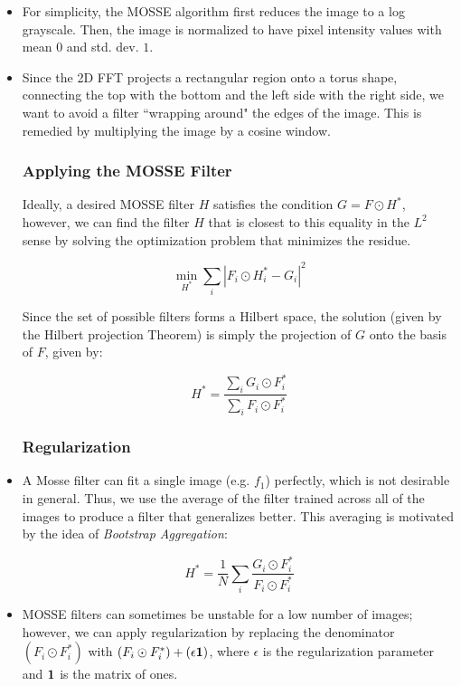 \documentclass[12pt]{article}
\newcommand{\bv}[1]{\ensuremath\mathbf{#1}}
\begin{document}
\begin{itemize}
\item For simplicity, the MOSSE algorithm first reduces the image to a log grayscale. Then, the image is normalized to have pixel intensity values with mean $0$ and std. dev. $1$.

\item Since the 2D FFT projects a rectangular region onto a torus shape, connecting the top with the bottom and the left side with the right side, we want to avoid a filter ``wrapping around" the edges of the image. This is remedied by multiplying the image by a cosine window.

\subsubsection*{Applying the MOSSE Filter}

Ideally, a desired MOSSE filter $H$ satisfies the condition $G = F \odot H^*$, however, we can find the filter $H$ that is closest to this equality in the $L^2$ sense by solving the optimization problem that minimizes the residue.

$$\min_{H^*}\sum_{i}|F_i \odot H_i^* - G_i|^2$$

Since the set of possible filters forms a Hilbert space, the solution (given by the Hilbert projection Theorem) is simply the projection of $G$ onto the basis of $F$, given by:

$$H^* = \frac{\sum_{i} G_i \odot F_i^*}{\sum_{i} F_i \odot F_i^*}$$

\subsubsection*{Regularization}

\item A Mosse filter can fit a single image (e.g. $f_1$) perfectly, which is not desirable in general. Thus, we use the average of the filter trained across all of the images to produce a filter that generalizes better. This averaging is motivated by the idea of \textit{Bootstrap Aggregation}:

$$H^* = \frac{1}{N}\sum_{i} \frac{G_i \odot F_i^*}{F_i \odot F_i^*}$$

\item MOSSE filters can sometimes be unstable for a low number of images; however, we can apply regularization by replacing the denominator $(F_i \odot F_i^*)$ with $(F_i \odot F_i^*) + (\epsilon\bv{1})$, where $\epsilon$ is the regularization parameter and $\bv{1}$ is the matrix of ones. 


\end{itemize}
\end{document}
